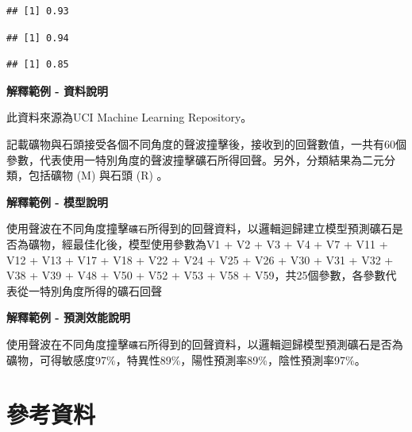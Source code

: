 \documentclass[]{book}
\newenvironment{Shaded}{\begin{snugshade}}{\end{snugshade}}
\newcommand{\KeywordTok}[1]{\textcolor[rgb]{0.13,0.29,0.53}{\textbf{#1}}}
\newcommand{\NormalTok}[1]{#1}
\newcommand{\OperatorTok}[1]{\textcolor[rgb]{0.81,0.36,0.00}{\textbf{#1}}}
\begin{document}
\begin{verbatim}
## [1] 0.93
\end{verbatim}

\begin{Shaded}
\end{Shaded}

\begin{verbatim}
## [1] 0.94
\end{verbatim}

\begin{Shaded}
\end{Shaded}

\begin{verbatim}
## [1] 0.85
\end{verbatim}

\textbf{解釋範例 - 資料說明}

此資料來源為UCI Machine Learning Repository。

記載礦物與石頭接受各個不同角度的聲波撞擊後，接收到的回聲數值，一共有60個參數，代表使用一特別角度的聲波撞擊礦石所得回聲。另外，分類結果為二元分類，包括礦物 (M) 與石頭 (R) 。

\textbf{解釋範例 - 模型說明}

使用聲波在不同角度撞擊\texttt{礦石}所得到的回聲資料，以邏輯迴歸建立模型預測礦石是否為礦物，經最佳化後，模型使用參數為V1 + V2 + V3 + V4 + V7 + V11 + V12 + V13 + V17 + V18 + V22 + V24 + V25 + V26 + V30 + V31 + V32 + V38 + V39 + V48 + V50 + V52 + V53 + V58 + V59，共25個參數，各參數代表從一特別角度所得的礦石回聲

\textbf{解釋範例 - 預測效能說明}

使用聲波在不同角度撞擊\texttt{礦石}所得到的回聲資料，以邏輯迴歸模型預測礦石是否為礦物，可得敏感度97\%，特異性89\%，陽性預測率89\%，陰性預測率97\%。

\hypertarget{ux53c3ux8003ux8cc7ux6599-1}{%
\section{參考資料}\label{ux53c3ux8003ux8cc7ux6599-1}}
\end{document}
